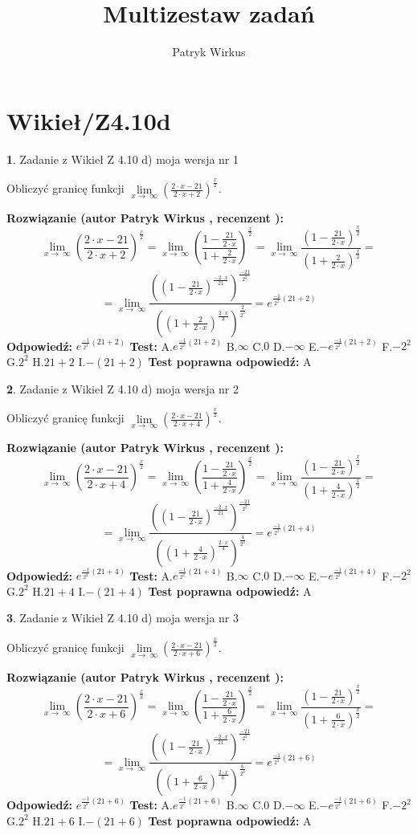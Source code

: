 \documentclass[12pt, a4paper]{article}
\title{Multizestaw zadań}
\author{Patryk Wirkus}
\date{}
\theoremstyle{definition} %
\newtheorem{zad}{}
\newcommand{\kategoria}[1]{\section{#1}}
\newcommand{\zadStart}[1]{\begin{zad}#1\newline}
\newcommand{\zadStop}{\end{zad}}
\newcommand{\rozwStart}[2]{\noindent \textbf{Rozwiązanie (autor #1 , recenzent #2): }\newline}
\newcommand{\rozwStop}{\newline}
\newcommand{\odpStart}{\noindent \textbf{Odpowiedź:}\newline}
\newcommand{\odpStop}{\newline}
\newcommand{\testStart}{\noindent \textbf{Test:}\newline}
\newcommand{\testStop}{\newline}
\newcommand{\kluczStart}{\noindent \textbf{Test poprawna odpowiedź:}\newline}
\newcommand{\kluczStop}{\newline}
\begin{document}
\maketitle

\kategoria{Wikieł/Z4.10d}


\zadStart{Zadanie z Wikieł Z 4.10 d) moja wersja nr 1}


Obliczyć granicę funkcji  $\lim\limits_{x\to\ \infty}(\frac{2\cdot x-21}{2\cdot x+2})^{\frac{x}{2}}$.
\zadStop
\rozwStart{Patryk Wirkus}{}
$$\lim\limits_{x\to\ \infty}(\frac{2\cdot x-21}{2\cdot x+2})^{\frac{x}{2}} = \lim\limits_{x\to\ \infty}(\frac{1-\frac{21}{2\cdot x}}{1+\frac{2}{2\cdot x}})^{\frac{x}{2}}=\lim\limits_{x\to\ \infty}\frac{(1-\frac{21}{2\cdot x})^{\frac{x}{2}}}{(1+\frac{2}{2\cdot x})^{\frac{x}{2}}}=$$
$$=\lim\limits_{x\to\ \infty}\frac{((1-\frac{21}{2\cdot x})^{\frac{-2\cdot x}{21}})^{\frac{-21}{2^{2}}}}{((1+\frac{2}{2\cdot x})^{\frac{2\cdot x}{2}})^{\frac{2}{2^{2}}}}=e^{\frac{-1}{2^{2}}(21+2)}$$
\rozwStop
\odpStart
$e^{\frac{-1}{2^{2}}(21+2)}$
\odpStop
\testStart
A.$e^{\frac{-1}{2^{2}}(21+2)}$ B.$\infty$ C.$0$ D.$-\infty$ E.$-e^{\frac{-1}{2^{2}}(21+2)}$
F.$-2^{2}$ G.$2^{2}$
H.$21+2$
I.$-(21+2)$
\testStop
\kluczStart
A
\kluczStop



\zadStart{Zadanie z Wikieł Z 4.10 d) moja wersja nr 2}


Obliczyć granicę funkcji  $\lim\limits_{x\to\ \infty}(\frac{2\cdot x-21}{2\cdot x+4})^{\frac{x}{2}}$.
\zadStop
\rozwStart{Patryk Wirkus}{}
$$\lim\limits_{x\to\ \infty}(\frac{2\cdot x-21}{2\cdot x+4})^{\frac{x}{2}} = \lim\limits_{x\to\ \infty}(\frac{1-\frac{21}{2\cdot x}}{1+\frac{4}{2\cdot x}})^{\frac{x}{2}}=\lim\limits_{x\to\ \infty}\frac{(1-\frac{21}{2\cdot x})^{\frac{x}{2}}}{(1+\frac{4}{2\cdot x})^{\frac{x}{2}}}=$$
$$=\lim\limits_{x\to\ \infty}\frac{((1-\frac{21}{2\cdot x})^{\frac{-2\cdot x}{21}})^{\frac{-21}{2^{2}}}}{((1+\frac{4}{2\cdot x})^{\frac{2\cdot x}{4}})^{\frac{4}{2^{2}}}}=e^{\frac{-1}{2^{2}}(21+4)}$$
\rozwStop
\odpStart
$e^{\frac{-1}{2^{2}}(21+4)}$
\odpStop
\testStart
A.$e^{\frac{-1}{2^{2}}(21+4)}$ B.$\infty$ C.$0$ D.$-\infty$ E.$-e^{\frac{-1}{2^{2}}(21+4)}$
F.$-2^{2}$ G.$2^{2}$
H.$21+4$
I.$-(21+4)$
\testStop
\kluczStart
A
\kluczStop



\zadStart{Zadanie z Wikieł Z 4.10 d) moja wersja nr 3}


Obliczyć granicę funkcji  $\lim\limits_{x\to\ \infty}(\frac{2\cdot x-21}{2\cdot x+6})^{\frac{x}{2}}$.
\zadStop
\rozwStart{Patryk Wirkus}{}
$$\lim\limits_{x\to\ \infty}(\frac{2\cdot x-21}{2\cdot x+6})^{\frac{x}{2}} = \lim\limits_{x\to\ \infty}(\frac{1-\frac{21}{2\cdot x}}{1+\frac{6}{2\cdot x}})^{\frac{x}{2}}=\lim\limits_{x\to\ \infty}\frac{(1-\frac{21}{2\cdot x})^{\frac{x}{2}}}{(1+\frac{6}{2\cdot x})^{\frac{x}{2}}}=$$
$$=\lim\limits_{x\to\ \infty}\frac{((1-\frac{21}{2\cdot x})^{\frac{-2\cdot x}{21}})^{\frac{-21}{2^{2}}}}{((1+\frac{6}{2\cdot x})^{\frac{2\cdot x}{6}})^{\frac{6}{2^{2}}}}=e^{\frac{-1}{2^{2}}(21+6)}$$
\rozwStop
\odpStart
$e^{\frac{-1}{2^{2}}(21+6)}$
\odpStop
\testStart
A.$e^{\frac{-1}{2^{2}}(21+6)}$ B.$\infty$ C.$0$ D.$-\infty$ E.$-e^{\frac{-1}{2^{2}}(21+6)}$
F.$-2^{2}$ G.$2^{2}$
H.$21+6$
I.$-(21+6)$
\testStop
\kluczStart
A
\kluczStop
\end{document}
